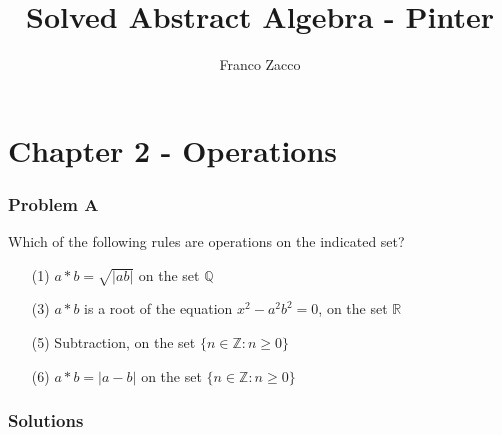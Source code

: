 \documentclass[11pt]{article}
\title{\textbf{Solved Abstract Algebra - Pinter}}
\author{Franco Zacco}
\date{}
\begin{document}
\maketitle
\thispagestyle{empty}

\section*{Chapter 2 - Operations}

\subsubsection*{Problem A}

Which of the following rules are operations on the indicated set?
\begin{itemize}
\item [(1)] $a * b = \sqrt{\mathopen|ab\mathclose|}$ on the set $\mathbb{Q}$
\item [(3)] $a * b$ is a root of the equation $x^2 - a^2b^2 = 0$, on the set $\mathbb{R}$
\item [(5)] Subtraction, on the set $\{n \in \mathbb{Z}: n \geq 0\}$
\item [(6)] $a * b = \mathopen|a - b\mathclose|$ on the set $\{n \in \mathbb{Z}: n \geq 0\}$
\end{itemize}

\subsubsection*{Solutions}
\end{document}
